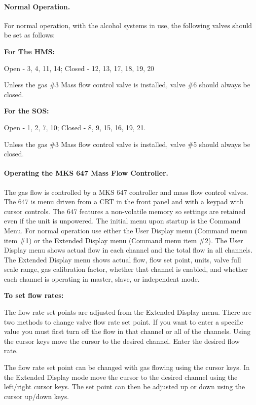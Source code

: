 \paragraph{Normal Operation.}

For normal operation, with the alcohol systems in use, the following valves
should be set as follows:

{\bf For The HMS:}

Open - 3, 4, 11, 14; Closed - 12, 13, 17, 18, 19, 20


Unless the gas \#3 Mass flow control valve is installed, valve \#6 should
always be closed.

{\bf For the SOS:}

Open - 1, 2, 7, 10; Closed - 8, 9, 15, 16, 19, 21.


Unless the gas \#3 Mass flow  control valve is installed, valve \#5 should
always be closed.

\paragraph{Operating the MKS 647 Mass Flow Controller.}

The gas flow is controlled by a MKS 647 controller and mass flow
control valves.  The 647 is menu driven from a CRT in the front panel and
with a keypad with cursor controls. The 647 features a non-volatile memory
so settings are retained even if the unit is unpowered.  The initial menu
upon startup is the Command Menu.  For normal operation use either the User
Display menu (Command menu item \#1) or the Extended Display menu (Command
menu item \#2).  The User Display menu shows actual flow in each channel and
the total flow in all channels.  The Extended Display menu shows actual
flow, flow set point, units, valve full scale range, gas calibration
factor, whether that channel is enabled, and whether each channel is
operating in master, slave, or independent mode.

{\bf To set flow rates:}

The flow rate set points are adjusted from the Extended Display
menu.  There are two methods to change valve flow rate set point.  If you
want to enter a specific value you must first turn off the flow in that
channel or all of the channels.  Using the cursor keys move the cursor to
the desired channel.  Enter the desired flow rate.

The flow rate set point can be changed with gas flowing using the
cursor keys. In the Extended Display mode move the cursor to the desired
channel using the left/right cursor keys.  The set point can then be
adjusted up or down using the cursor up/down keys.

